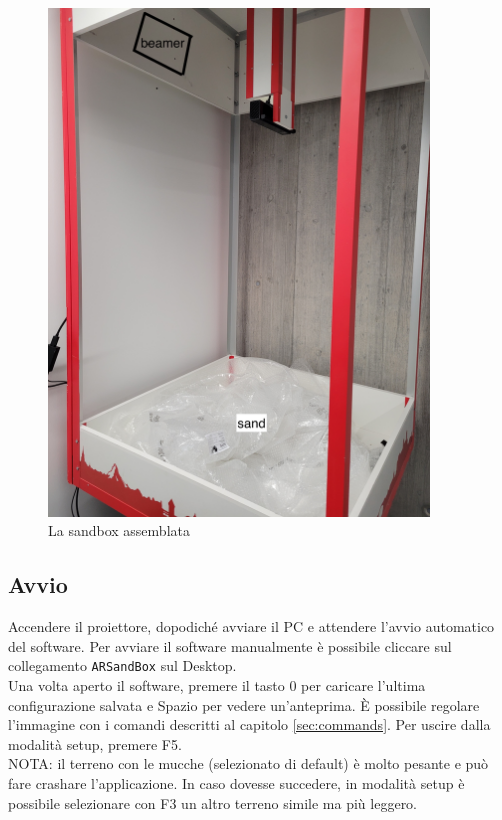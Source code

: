 \documentclass[12pt]{article}
\begin{document}
		\begin{figure}[H]
			\centering
			\includegraphics[width=0.9\textwidth]{img/sandbox.jpg}
			\caption*{La sandbox assemblata}
		\end{figure}
		
		
	\subsection{Avvio}

		Accendere il proiettore, dopodiché avviare il PC e attendere l'avvio automatico del software.
		Per avviare il software manualmente è possibile cliccare sul collegamento
		\texttt{ARSandBox} sul Desktop.\\

		Una volta aperto il software, premere il tasto 0 per caricare l'ultima configurazione salvata e
		Spazio per vedere un'anteprima. È possibile regolare l'immagine con i comandi descritti
		al capitolo \ref{sec:commands}. Per uscire dalla modalità setup, premere F5.\\

		NOTA: il terreno con le mucche (selezionato di default) è molto pesante e può fare crashare l'applicazione.
		In caso dovesse succedere, in modalità setup è possibile selezionare con F3 un altro terreno simile
		ma più leggero.
		
\end{document}
